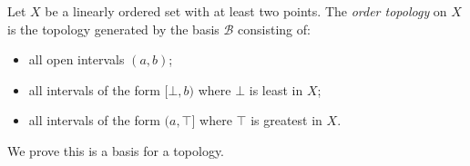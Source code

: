 \begin{definition}
    Let $X$ be a linearly ordered set with at least two points. The \emph{order topology} on $X$ is the topology
    generated by the basis $\mathcal{B}$ consisting of:
    \begin{itemize}
        \item all open intervals $(a,b)$;
        \item all intervals of the form $[\bot,b)$ where $\bot$ is least in $X$;
        \item all intervals of the form $(a,\top]$ where $\top$ is greatest in $X$.
    \end{itemize}
\end{definition}

We prove this is a basis for a topology.

